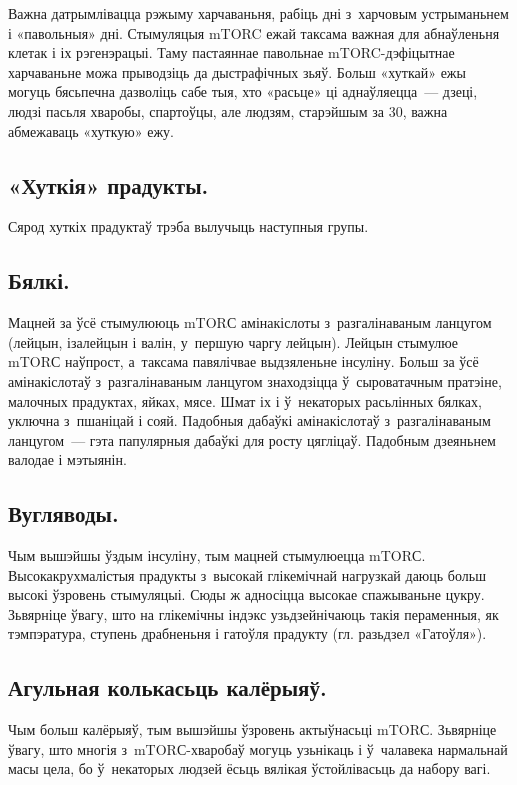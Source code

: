
Важна датрымлівацца рэжыму харчаваньня, рабіць дні з~харчовым устрыманьнем і «павольныя» дні. Стымуляцыя mTORC ежай таксама важная для абнаўленьня клетак і іх рэгенэрацыі. Таму пастаяннае павольнае mTORC-дэфіцытнае харчаваньне можа прыводзіць да дыстрафічных зьяў. Больш «хуткай» ежы могуць бясьпечна дазволіць сабе тыя, хто «расьце» ці аднаўляецца~--- дзеці, людзі пасьля хваробы, спартоўцы, але людзям, старэйшым за 30, важна абмежаваць «хуткую» ежу.

\subsection{«Хуткія» прадукты.}
Сярод хуткіх прадуктаў трэба вылучыць наступныя групы.

\subsection{Бялкі.}
Мацней за ўсё стымулююць mTORС амінакіслоты з~разгалінаваным ланцугом (лейцын, ізалейцын і валін, у~першую чаргу лейцын). Лейцын стымулюе mTORС наўпрост, а~таксама павялічвае выдзяленьне інсуліну. Больш за ўсё амінакіслотаў з~разгалінаваным ланцугом знаходзіцца ў~сыроватачным пратэіне, малочных прадуктах, яйках, мясе. Шмат іх і ў~некаторых расьлінных бялках, уключна з~пшаніцай і сояй. Падобныя дабаўкі амінакіслотаў з~разгалінаваным ланцугом~--- гэта папулярныя дабаўкі для росту цягліцаў. Падобным дзеяньнем валодае і мэтыянін.

\subsection{Вугляводы.}
Чым вышэйшы ўздым інсуліну, тым мацней стымулюецца mTORС. Высокакрухмалістыя прадукты з~высокай глікемічнай нагрузкай даюць больш высокі ўзровень стымуляцыі. Сюды ж адносіцца высокае спажываньне цукру. Зьвярніце ўвагу, што на глікемічны індэкс узьдзейнічаюць такія пераменныя, як тэмпэратура, ступень драбненьня і гатоўля прадукту (гл. разьдзел «Гатоўля»).

\subsection{Агульная колькасьць калёрыяў.}
Чым больш калёрыяў, тым вышэйшы ўзровень актыўнасьці mTORС. Зьвярніце ўвагу, што многія з~mTORС-хваробаў могуць узьнікаць і ў~чалавека нармальнай масы цела, бо ў~некаторых людзей ёсьць вялікая ўстойлівасьць да набору вагі.

